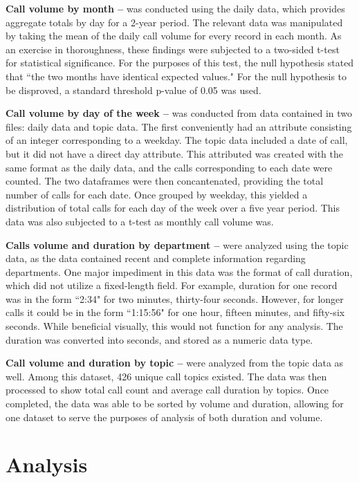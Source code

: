 \documentclass{article}
\begin{document}
\textbf{Call volume by month --} was conducted using the daily data, which provides aggregate totals by day for a 2-year period. The relevant data was manipulated by taking the mean of the daily call volume for every record in each month.  As an exercise in thoroughness, these findings were subjected to a two-sided t-test for statistical significance.  For the purposes of this test, the null hypothesis stated that ``the two months have identical expected values."  For the null hypothesis to be disproved, a standard threshold p-value of 0.05 was used.
\par
\textbf{Call volume by day of the week --} was conducted from data contained in two files: daily data and topic data.  The first conveniently had an attribute consisting of an integer corresponding to a weekday.  The topic data included a date of call, but it did not have a direct day attribute.  This attributed was created with the same format as the daily data, and the calls corresponding to each date were counted.  The two dataframes were then concantenated, providing the total number of calls for each date.  Once grouped by weekday, this yielded a distribution of total calls for each day of the week over a five year period.  This data was also subjected to a t-test as monthly call volume was.
\par
\textbf{Calls volume and duration by department --} were analyzed using the topic data, as the data contained recent and complete information regarding departments.  One major impediment in this data was the format of call duration, which did not utilize a fixed-length field.  For example, duration for one record was in the form ``2:34" for two minutes, thirty-four seconds.  However, for longer calls it could be in the form ``1:15:56" for one hour, fifteen minutes, and fifty-six seconds.  While beneficial visually, this would not function for any analysis.  The duration was converted into seconds, and stored as a numeric data type.
\par
\textbf{Call volume and duration by topic --} were analyzed from the topic data as well.  Among this dataset, 426 unique call topics existed.  The data was then processed to show total call count and average call duration by topics.  Once completed, the data was able to be sorted by volume and duration, allowing for one dataset to serve the purposes of analysis of both duration and volume.


\section{Analysis}
\end{document}
